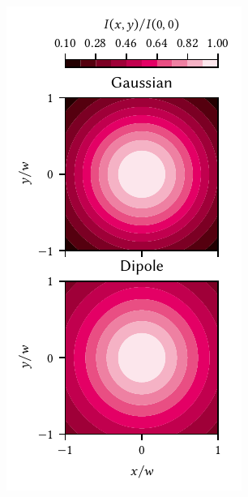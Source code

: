 \begin{marginfigure}
    \centering
    \includegraphics{img/pdf/setup/modes_2d}
    \caption[]{}
    \label{fig:setup:optics:coupling:modes_2d}
\end{marginfigure}

